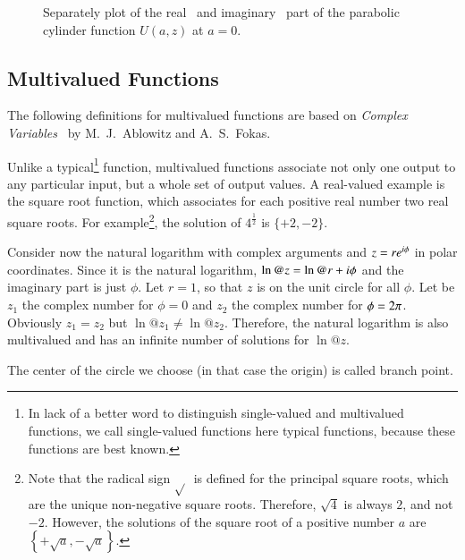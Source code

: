 \begin{figure}[!htp]
    \centering
    \vspace{-0.1cm}
    \caption{Separately plot of the real~\protect{} and imaginary~\protect{} part of the parabolic cylinder function $U(a,z)$ at $a=0$.}
    \label{fig:cylinderUSplit}
\end{figure}

\subsection{Multivalued Functions}
The following definitions for multivalued functions are based on \textit{Complex Variables}~\cite{ComplexVariables} by M.~J.~Ablowitz and A.~S.~Fokas.

Unlike a typical\footnote{In lack of a better word to distinguish single-valued and multivalued functions, we call single-valued functions here typical functions, because these functions are best known.} function, multivalued functions associate not only one output to any particular input, but a whole set of output values. A real-valued example is the square root function, which associates for each positive real number two real square roots. For example\footnote{Note that the radical sign $\sqrt{}$\ is defined for the principal square roots, which are the unique non-negative square roots. Therefore, $\sqrt{4}$ is always $2$, and not $-2$. However, the solutions of the square root of a positive number $a$ are $\left\{+\sqrt{a},-\sqrt{a}\right\}$.}, the solution of $4^{\frac{1}{2}}$ is $\{+2,-2\}$.

Consider now the natural logarithm with complex arguments and $z = r{e}^{{i}\phi}$ in polar coordinates. Since it is the natural logarithm, $\ln@{z} = \ln@{r} + \iunit\phi$ and the imaginary part is just $\phi$. Let $r = 1$, so that $z$ is on the unit circle for all $\phi$. Let be $z_1$ the complex number for $\phi = 0$ and $z_2$ the complex number for $\phi = 2{\pi}$. Obviously $z_1 = z_2$ but $\ln@{z_1} \neq \ln@{z_2}$. Therefore, the natural logarithm is also multivalued and has an infinite number of solutions for $\ln@{z}$. 

The center of the circle we choose (in that case the origin) is called branch point.

